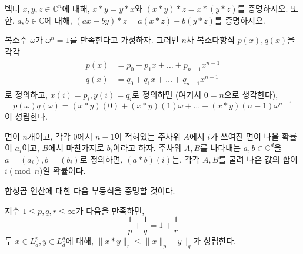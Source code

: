 \begin{exercise}
    벡터 $x, y, z \in \mathbb{C}^n$에 대해, $x * y = y * x$와 $(x * y) * z = x * (y * z)$를 증명하시오.
    또한, $a, b \in \mathbb{C}$에 대해, $(ax + by) * z = a (x * z) + b (y * z)$를 증명하시오.
\end{exercise}

\begin{example}
    복소수 $\omega$가 $\omega^n = 1$를 만족한다고 가정하자.
    그러면 $n$차 복소다항식 $p(x), q(x)$을 각각
    \begin{align*}
    \begin{split}
        p(x) &= p_0 + p_1x + \dots + p_{n - 1}x^{n - 1} \\
        q(x) &= q_0 + q_1x + \dots + q_{n - 1}x^{n - 1}
    \end{split}
    \end{align*}
    로 정의하고, $x(i) = p_i, y(i) = q_i$로 정의하면 (여기서 $0 = n$으로 생각한다),
    \begin{equation*}
        p(\omega)q(\omega) = (x * y)(0) + (x * y)(1)\omega + \dots + (x * y)(n - 1)\omega^{n - 1}
    \end{equation*}
    이 성립한다.
\end{example}

\begin{example}
    면이 $n$개이고, 각각 $0$에서 $n - 1$이 적혀있는 주사위 $A$에서 $i$가 쓰여진 면이 나올 확률이 $a_i$이고, $B$에서 마찬가지로 $b_i$이라고 하자.
    주사위 $A, B$를 나타내는 $a, b \in \mathbb{C}^d$을 $a = (a_i), b = (b_i)$로 정의하면, $(a * b)(i)$는, 각각 $A, B$를 굴려 나온 값의 합이 $i \pmod{n}$일 확률이다.
\end{example}

합성곱 연산에 대한 다음 부등식을 증명할 것이다.
\begin{theorem}[Young]
\label{thm:youngconvineq} 
    지수 $1 \leq p, q, r \leq \infty$가 다음을 만족하면,
    \begin{equation*}
        \frac{1}{p} + \frac{1}{q} = 1 + \frac{1}{r}
    \end{equation*}
    두 $x \in L^p_d, y \in L^q_d$에 대해, $\|x * y\|_r \leq \|x\|_p \|y\|_q$가 성립한다.
\end{theorem}

